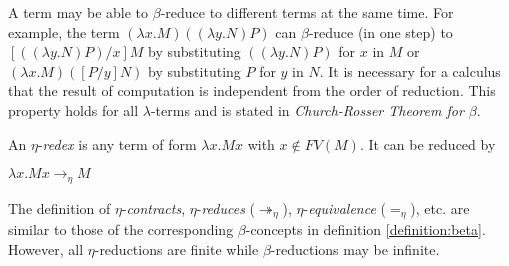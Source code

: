 A term may be able to $ \beta $-reduce to different terms at the same time. For example, the term $ (\lambda x.M)((\lambda y.N)P) $ can $ \beta $-reduce (in one step) to $ [((\lambda y.N)P)/x]M $ by substituting $ ((\lambda y.N)P) $ for $ x $ in $ M $ or $ (\lambda x.M)([P/y]N) $ by substituting $ P $ for $ y $ in $ N $. It is necessary for a calculus that the result of computation is independent from the order of reduction. This property holds for all $ \lambda $-terms and is stated in \emph{Church-Rosser Theorem for $ \beta $}.
\mbox\\
\begin{definition}
\label{definition:eta}
An $ \eta $-\emph{redex} is any term of form  $ \lambda x.Mx $ with $ x \not\in FV(M) $. It can be reduced by 
\begin{center}
$ \lambda x.Mx \to _\eta M $
\end{center}
The definition of $ \eta $-\emph{contracts}, $ \eta $-\emph{reduces} ($ \twoheadrightarrow _\eta $), $ \eta $-\emph{equivalence} ($ =_\eta $), etc. are similar to those of the corresponding $ \beta $-concepts in definition \ref{definition:beta}. However, all $ \eta $-reductions are finite while $ \beta $-reductions may be infinite.
\end{definition}

